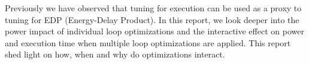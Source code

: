 Previously we have observed that tuning for execution can be used as a proxy to tuning for EDP (Energy-Delay Product).
In this report, we look deeper into the power impact of individual loop optimizations and the interactive effect on
power and execution time when multiple loop optimizations are applied. 
This report shed light on how, when and why do optimizations interact. 
